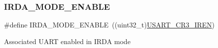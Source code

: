 \subsubsection{\texorpdfstring{I\+R\+D\+A\+\_\+\+M\+O\+D\+E\+\_\+\+E\+N\+A\+B\+LE}{IRDA\_MODE\_ENABLE}}
{\footnotesize\ttfamily \#define I\+R\+D\+A\+\_\+\+M\+O\+D\+E\+\_\+\+E\+N\+A\+B\+LE~((uint32\+\_\+t)\hyperlink{group___peripheral___registers___bits___definition_ga31c66373bfbae7724c836ac63b8411dd}{U\+S\+A\+R\+T\+\_\+\+C\+R3\+\_\+\+I\+R\+EN})}

Associated U\+A\+RT enabled in I\+R\+DA mode 